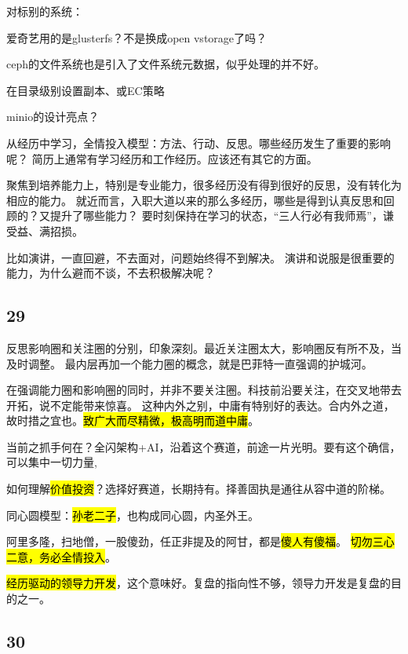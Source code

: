 对标别的系统：
\begin{enumbox}
\item 爱奇艺用的是glusterfs？不是换成open vstorage了吗？
\item ceph的文件系统也是引入了文件系统元数据，似乎处理的并不好。
\item 在目录级别设置副本、或EC策略
\item minio的设计亮点？
\end{enumbox}

\hrulefill

从经历中学习，全情投入模型：方法、行动、反思。哪些经历发生了重要的影响呢？
简历上通常有学习经历和工作经历。应该还有其它的方面。

聚焦到培养能力上，特别是专业能力，很多经历没有得到很好的反思，没有转化为相应的能力。
就近而言，入职大道以来的那么多经历，哪些是得到认真反思和回顾的？又提升了哪些能力？
要时刻保持在学习的状态，“三人行必有我师焉”，谦受益、满招损。

比如演讲，一直回避，不去面对，问题始终得不到解决。
演讲和说服是很重要的能力，为什么避而不谈，不去积极解决呢？

\subsection{29}

反思影响圈和关注圈的分别，印象深刻。最近关注圈太大，影响圈反有所不及，当及时调整。
最内层再加一个能力圈的概念，就是巴菲特一直强调的护城河。

在强调能力圈和影响圈的同时，并非不要关注圈。科技前沿要关注，在交叉地带去开拓，说不定能带来惊喜。
这种内外之别，中庸有特别好的表达。合内外之道，故时措之宜也。\hl{致广大而尽精微，极高明而道中庸}。

当前之抓手何在？全闪架构+AI，沿着这个赛道，前途一片光明。要有这个确信，可以集中一切力量,

如何理解\hl{价值投资}？选择好赛道，长期持有。择善固执是通往从容中道的阶梯。

同心圆模型：\hl{孙老二子}，也构成同心圆，内圣外王。

\hrulefill

阿里多隆，扫地僧，一股傻劲，任正非提及的阿甘，都是\hl{傻人有傻福}。
\hl{切勿三心二意，务必全情投入}。

\hl{经历驱动的领导力开发}，这个意味好。复盘的指向性不够，领导力开发是复盘的目的之一。

\subsection{30}


